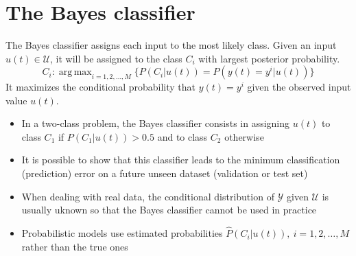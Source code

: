 \documentclass{book}
\DeclareMathOperator*{\argmax}{arg\,max}
\theoremstyle{definition}
\theoremstyle{remark}
\theoremstyle{remark}
\begin{document}
\section{The Bayes classifier}
The Bayes classifier assigns each input to the most likely class. Given an input $u(t)\in \mathcal{U}$, it will be assigned to the class $C_i$ with largest posterior probability. 
\[
    C_i : \argmax_{i=1,2,\dots,M}\{P(C_i|u(t))=P(y(t)=y^i|u(t)) \}
\]
It maximizes the conditional probability that $y(t)=y^i$ given the observed input value $u(t)$. 
\begin{itemize}
    \item In a two-class problem, the Bayes classifier consists in assigning $u(t)$ to class $C_1$ if $P(C_1|u(t))>0.5$ and to class $C_2$ otherwise 
    \item It is possible to show that this classifier leads to the minimum classification (prediction) error on a future unseen dataset (validation or test set)
    \item When dealing with real data, the conditional distribution of $\mathcal{Y}$ given $\mathcal{U}$ is usually uknown so that the Bayes classifier cannot be used in practice 
    \item Probabilistic models use estimated probabilities $\hat{P}(C_i|u(t)),\ i=1,2,\dots,M$ rather than the true ones
\end{itemize}
\end{document}
